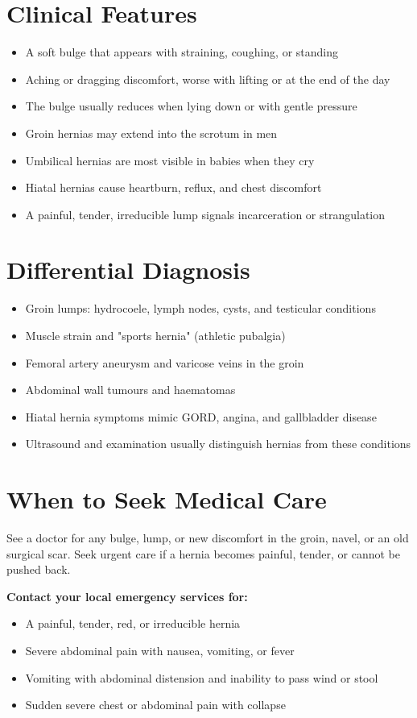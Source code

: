 \section*{Clinical Features}
\begin{itemize}
    \item A soft bulge that appears with straining, coughing, or standing
    \item Aching or dragging discomfort, worse with lifting or at the end of the day
    \item The bulge usually reduces when lying down or with gentle pressure
    \item Groin hernias may extend into the scrotum in men
    \item Umbilical hernias are most visible in babies when they cry
    \item Hiatal hernias cause heartburn, reflux, and chest discomfort
    \item A painful, tender, irreducible lump signals incarceration or strangulation
\end{itemize}

\section*{Differential Diagnosis}
\begin{itemize}
    \item Groin lumps: hydrocoele, lymph nodes, cysts, and testicular conditions
    \item Muscle strain and "sports hernia" (athletic pubalgia)
    \item Femoral artery aneurysm and varicose veins in the groin
    \item Abdominal wall tumours and haematomas
    \item Hiatal hernia symptoms mimic GORD, angina, and gallbladder disease
    \item Ultrasound and examination usually distinguish hernias from these conditions
\end{itemize}

\section*{When to Seek Medical Care}
See a doctor for any bulge, lump, or new discomfort in the groin, navel, or an old surgical scar. Seek urgent care if a hernia becomes painful, tender, or cannot be pushed back.

\textbf{Contact your local emergency services for:}
\begin{itemize}
    \item A painful, tender, red, or irreducible hernia
    \item Severe abdominal pain with nausea, vomiting, or fever
    \item Vomiting with abdominal distension and inability to pass wind or stool
    \item Sudden severe chest or abdominal pain with collapse
\end{itemize}

